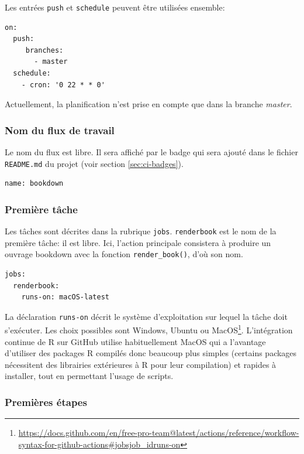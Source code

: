 \documentclass[
  12pt,
  french,
  a4paper,
  extrafontsizes,onecolumn,openright
  ]{memoir}
\begin{document}
Les entrées \texttt{push} et \texttt{schedule} peuvent être utilisées ensemble:

\begin{verbatim}
on:
  push:
     branches:
       - master
  schedule:
    - cron: '0 22 * * 0'
\end{verbatim}

Actuellement, la planification n'est prise en compte que dans la branche \emph{master}.

\subsubsection{Nom du flux de travail}\label{nom-du-flux-de-travail}

Le nom du flux est libre.
Il sera affiché par le badge qui sera ajouté dans le fichier \texttt{README.md} du projet (voir section \ref{sec:ci-badges}).

\begin{verbatim}
name: bookdown
\end{verbatim}

\subsubsection{Première tâche}\label{premiuxe8re-tuxe2che}

Les tâches sont décrites dans la rubrique \texttt{jobs}.
\texttt{renderbook} est le nom de la première tâche: il est libre.
Ici, l'action principale consistera à produire un ouvrage bookdown avec la fonction \texttt{render\_book()}, d'où son nom.

\begin{verbatim}
jobs:
  renderbook:
    runs-on: macOS-latest
\end{verbatim}

La déclaration \texttt{runs-on} décrit le système d'exploitation sur lequel la tâche doit s'exécuter.
Les choix possibles sont Windows, Ubuntu ou MacOS\footnote{\url{https://docs.github.com/en/free-pro-team@latest/actions/reference/workflow-syntax-for-github-actions\#jobsjob_idruns-on}}.
L'intégration continue de R sur GitHub utilise habituellement MacOS qui a l'avantage d'utiliser des packages R compilés donc beaucoup plus simples (certains packages nécessitent des librairies extérieures à R pour leur compilation) et rapides à installer, tout en permettant l'usage de scripts.

\subsubsection{Premières étapes}\label{premiuxe8res-uxe9tapes}
\end{document}

